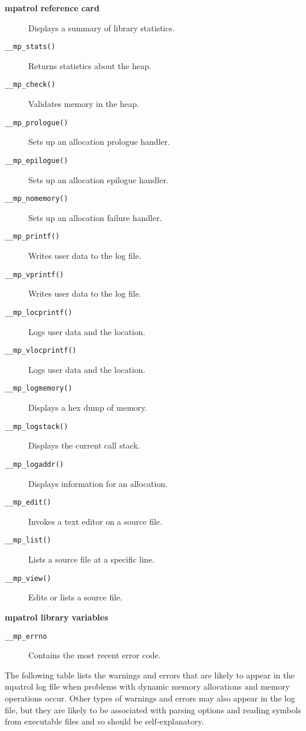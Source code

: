 \documentclass[a4paper,landscape,final]{article}
\newcommand{\heading}[1]{\textbf{\normalsize #1}}
\newcommand{\function}[1]{\texttt{#1()}}
\newcommand{\variable}[1]{\texttt{#1}}
\begin{document}
\begin{multicols}{3}{\textbf{\Large mpatrol reference card}}
\begin{description}
\hfill Displays a summary of library statistics.
\item[\function{\_\_mp\_stats}]
\hfill Returns statistics about the heap.
\item[\function{\_\_mp\_check}]
\hfill Validates memory in the heap.
\item[\function{\_\_mp\_prologue}]
\hfill Sets up an allocation prologue handler.
\item[\function{\_\_mp\_epilogue}]
\hfill Sets up an allocation epilogue handler.
\item[\function{\_\_mp\_nomemory}]
\hfill Sets up an allocation failure handler.
\item[\function{\_\_mp\_printf}]
\hfill Writes user data to the log file.
\item[\function{\_\_mp\_vprintf}]
\hfill Writes user data to the log file.
\item[\function{\_\_mp\_locprintf}]
\hfill Logs user data and the location.
\item[\function{\_\_mp\_vlocprintf}]
\hfill Logs user data and the location.
\item[\function{\_\_mp\_logmemory}]
\hfill Displays a hex dump of memory.
\item[\function{\_\_mp\_logstack}]
\hfill Displays the current call stack.
\item[\function{\_\_mp\_logaddr}]
\hfill Displays information for an allocation.
\item[\function{\_\_mp\_edit}]
\hfill Invokes a text editor on a source file.
\item[\function{\_\_mp\_list}]
\hfill Lists a source file at a specific line.
\item[\function{\_\_mp\_view}]
\hfill Edits or lists a source file.
\end{description}

\vskip 12pt
\heading{mpatrol library variables}
\vskip 6pt

\begin{description}
\item[\variable{\_\_mp\_errno}]
\hfill Contains the most recent error code.
\end{description}

\vskip 12pt

The following table lists the warnings and errors that are likely to appear in
the mpatrol log file when problems with dynamic memory allocations and memory
operations occur.  Other types of warnings and errors may also appear in the log
file, but they are likely to be associated with parsing options and reading
symbols from executable files and so should be self-explanatory.


\end{multicols}
\end{document}
